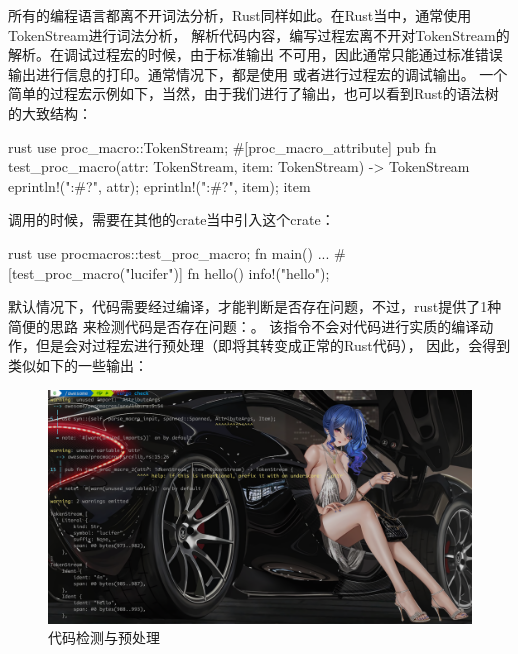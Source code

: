 所有的编程语言都离不开词法分析，Rust同样如此。在Rust当中，通常使用TokenStream进行词法分析，
解析代码内容，编写过程宏离不开对TokenStream的解析。在调试过程宏的时候，由于标准输出
不可用，因此通常只能通过标准错误输出进行信息的打印。通常情况下，都是使用
或者进行过程宏的调试输出。
一个简单的过程宏示例如下，当然，由于我们进行了输出，也可以看到Rust的语法树的大致结构：
\begin{code-block}{rust}
use proc_macro::TokenStream;
#[proc_macro_attribute]
pub fn test_proc_macro(attr: TokenStream, item: TokenStream) -> TokenStream {
    eprintln!("{:#?}", attr);
    eprintln!("{:#?}", item);
    item
}
\end{code-block}
调用的时候，需要在其他的crate当中引入这个crate：
\begin{code-block}{rust}
use procmacros::test_proc_macro;
fn main() {
    ...
}
#[test_proc_macro("lucifer")]
fn hello() {
    info!("hello");
}
\end{code-block}

默认情况下，代码需要经过编译，才能判断是否存在问题，不过，rust提供了1种简便的思路
来检测代码是否存在问题：。
该指令不会对代码进行实质的编译动作，但是会对过程宏进行预处理（即将其转变成正常的Rust代码），
因此，会得到类似如下的一些输出：
\begin{figure}[H]
  \centering
  \includegraphics[width=\linewidth]{rust_cargo_check.png}
  \caption{代码检测与预处理}
  \label{fig:rust_cargo_check}
\end{figure}

